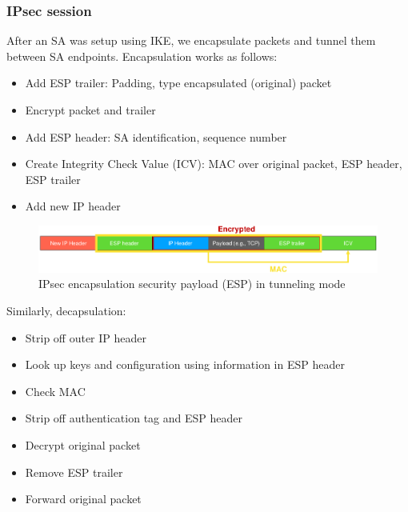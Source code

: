 \documentclass[11pt,oneside,a4paper]{article}
\begin{document}
\subsubsection{IPsec session}

After an SA was setup using IKE, we encapsulate packets and tunnel them between SA endpoints. Encapsulation works as follows:

\vspace{-\topsep}
\begin{itemize}
	\setlength{\itemsep}{0pt}
	\setlength{\parskip}{0pt}
	\item Add ESP trailer: Padding, type encapsulated (original) packet
	\item Encrypt packet and trailer
	\item Add ESP header: SA identification, sequence number
	\item Create Integrity Check Value (ICV): MAC over original packet, ESP	header, ESP trailer
	\item Add new IP header
\end{itemize}
\vspace{-\topsep}

\begin{figure}
	\centering
	\includegraphics[width=0.7\linewidth]{figures/ipsec_encapsulation}
	\caption{IPsec encapsulation security payload (ESP) in tunneling mode}
	\label{fig:ipsecencapsulation}
\end{figure}

Similarly, decapsulation:

\vspace{-\topsep}
\begin{itemize}
	\setlength{\itemsep}{0pt}
	\setlength{\parskip}{0pt}
	\item Strip off outer IP header
	\item Look up keys and configuration using information in ESP header
	\item Check MAC
	\item Strip off authentication tag and ESP header
	\item Decrypt original packet
	\item Remove ESP trailer
	\item Forward original packet
\end{itemize}
\vspace{-\topsep}
\end{document}
